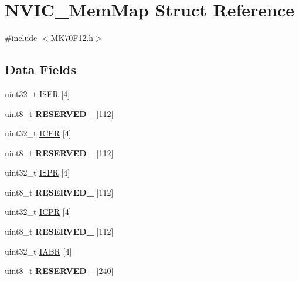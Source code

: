 \hypertarget{struct_n_v_i_c___mem_map}{}\section{N\+V\+I\+C\+\_\+\+Mem\+Map Struct Reference}
\label{struct_n_v_i_c___mem_map}


{\ttfamily \#include $<$M\+K70\+F12.\+h$>$}

\subsection*{Data Fields}
\begin{DoxyCompactItemize}
\item 
uint32\+\_\+t \hyperlink{struct_n_v_i_c___mem_map_abd212d27ccda188473e4e918f0cc8aff}{I\+S\+E\+R} \mbox{[}4\mbox{]}
\item 
\hypertarget{struct_n_v_i_c___mem_map_a672371a65afa3a33d6d4bf26f54014fe}{}uint8\+\_\+t {\bfseries R\+E\+S\+E\+R\+V\+E\+D\+\_} \mbox{[}112\mbox{]}\label{struct_n_v_i_c___mem_map_a672371a65afa3a33d6d4bf26f54014fe}

\item 
uint32\+\_\+t \hyperlink{struct_n_v_i_c___mem_map_a44632f5cb66efc81e73970988a899334}{I\+C\+E\+R} \mbox{[}4\mbox{]}
\item 
\hypertarget{struct_n_v_i_c___mem_map_a4fc17c3f34f5db09bc5b3594324a2b67}{}uint8\+\_\+t {\bfseries R\+E\+S\+E\+R\+V\+E\+D\+\_} \mbox{[}112\mbox{]}\label{struct_n_v_i_c___mem_map_a4fc17c3f34f5db09bc5b3594324a2b67}

\item 
uint32\+\_\+t \hyperlink{struct_n_v_i_c___mem_map_a1067a671b702e7fac08c0733131e8454}{I\+S\+P\+R} \mbox{[}4\mbox{]}
\item 
\hypertarget{struct_n_v_i_c___mem_map_a6452a50947e86da5cc01df353d697c8b}{}uint8\+\_\+t {\bfseries R\+E\+S\+E\+R\+V\+E\+D\+\_} \mbox{[}112\mbox{]}\label{struct_n_v_i_c___mem_map_a6452a50947e86da5cc01df353d697c8b}

\item 
uint32\+\_\+t \hyperlink{struct_n_v_i_c___mem_map_a18f7154bcaf967d002d2cb1bd480a66a}{I\+C\+P\+R} \mbox{[}4\mbox{]}
\item 
\hypertarget{struct_n_v_i_c___mem_map_a002afb1e428bb77c95ac38cb11c19e9d}{}uint8\+\_\+t {\bfseries R\+E\+S\+E\+R\+V\+E\+D\+\_} \mbox{[}112\mbox{]}\label{struct_n_v_i_c___mem_map_a002afb1e428bb77c95ac38cb11c19e9d}

\item 
uint32\+\_\+t \hyperlink{struct_n_v_i_c___mem_map_ac2813e9c133793584e82f645f7e5c2ad}{I\+A\+B\+R} \mbox{[}4\mbox{]}
\item 
\hypertarget{struct_n_v_i_c___mem_map_a89f6bffb5c9ffeeb4a53e75be5bd8387}{}uint8\+\_\+t {\bfseries R\+E\+S\+E\+R\+V\+E\+D\+\_} \mbox{[}240\mbox{]}\label{struct_n_v_i_c___mem_map_a89f6bffb5c9ffeeb4a53e75be5bd8387}


\end{DoxyCompactItemize}
